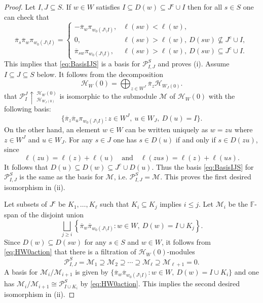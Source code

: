 \documentclass{amsart}
\newtheorem*{Young's Rule}{Young's Rule}
\theoremstyle{definition}
\theoremstyle{remark}
\numberwithin{equation}{section}
\begin{document}
\begin{proof}
Let $I,J\subseteq S$. If $w\in W$ satisfies $I\subseteq D(w)\subseteq J^c\cup I$ then for all $s\in S$ one can check that
\begin{equation}\label{eq:HW0action}
{\overline{\pi}}_s {\overline{\pi}}_w\pi_{w_0(J\setminus I)} = \begin{cases}
-{\overline{\pi}}_w\pi_{w_0(J\setminus I)}, & \ell(sw)<\ell(w), \\
0, &  \ell(sw)>\ell(w),\ D(sw) \not\subseteq J^c\cup I,\\
{\overline{\pi}}_{sw}\pi_{w_0(J\setminus I)}, & \ell(sw)>\ell(w),\ D(sw)\subseteq J^c\cup I.
\end{cases} 
\end{equation}
This implies that \eqref{eq:BasisIJS} is a basis for ${\mathcal{P}_{I,J}^S}$ and proves (i). Assume $I\subseteq J\subseteq S$ below. It follows from the decomposition
\[
{\mathcal{H}}_W(0) = \bigoplus_{z\in W^J} {\overline{\pi}}_z {\mathcal{H}}_{W_J(0)}.
\]
that ${\mathcal{P}}_I^J \uparrow\,_{{\mathcal{H}}_{W_J(0)}}^{{\mathcal{H}}_W(0)}$ is isomorphic to the submodule ${\mathcal{M}}$ of ${\mathcal{H}}_W(0)$ with the following basis:
\[
\{ {\overline{\pi}}_z {\overline{\pi}}_u \pi_{w_0(J\setminus I)}: z\in W^J,\ u\in W_J,\ D(u) = I \}.
\]
On the other hand, an element $w\in W$ can be written uniquely as $w=zu$ where $z\in W^J$ and $u\in W_J$. For any $s\in J$ one has $s\in D(u)$ if and only if $s\in D(zu)$, since
\[
\ell(zu) = \ell(z) + \ell(u) \quad \text{and} \quad \ell(zus) = \ell(z) + \ell(us).
\]
It follows that $D(u)\subseteq D(w)\subseteq J^c\cup D(u)$. Thus the basis \eqref{eq:BasisIJS} for ${\mathcal{P}_{I,J}^S}$ is the same as the basis for ${\mathcal{M}}$, i.e. ${\mathcal{P}_{I,J}^S}={\mathcal{M}}$. This proves the first desired isomorphism in (ii).

Let subsets of $J^c$ be $K_1,\ldots,K_\ell$ such that $K_i\subseteq K_j$ implies $i\le j$. Let ${\mathcal{M}}_i$ be the ${{\mathbb F}}$-span of the disjoint union
\[
\bigsqcup_{j\ge i} \left\{ {\overline{\pi}}_w {\overline{\pi}}_{w_0(J\setminus I)}: w\in W,\ D(w) = I\cup K_j \right\}.
\]
Since $D(w)\subseteq D(sw)$ for any $s\in S$ and $w\in W$, it follows from \eqref{eq:HW0action} that there is a filtration of ${\mathcal{H}}_W(0)$-modules
\[
{\mathcal{P}_{I,J}^S} ={\mathcal{M}}_1\supseteq {\mathcal{M}}_2\supseteq\cdots\supseteq {\mathcal{M}}_\ell\supseteq {\mathcal{M}}_{\ell+1}=0.
\]
A basis for ${\mathcal{M}}_i/{\mathcal{M}}_{i+1}$ is given by $\{{\overline{\pi}}_w {\overline{\pi}}_{w_0(J\setminus I)}: w\in W,\ D(w) = I\cup K_i\}$ and one has ${\mathcal{M}}_i/{\mathcal{M}}_{i+1} \cong {\mathcal{P}}_{I\cup K_i}^S$ by \eqref{eq:HW0action}. This implies the second desired isomorphism in (ii).
\end{proof}
\end{document}
